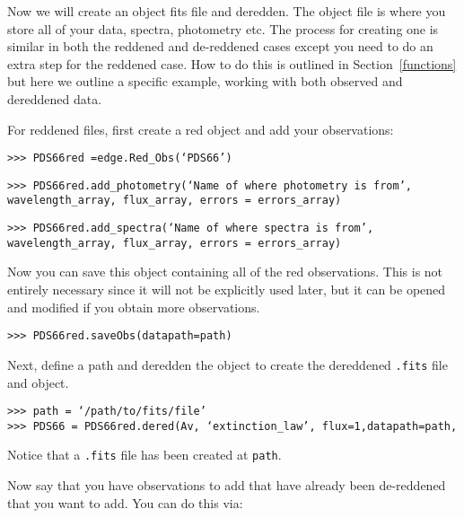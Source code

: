 \documentclass{article}
\begin{document}
\noindent Now we will create an object fits file and deredden. The object file is where you store all of your data, spectra, photometry etc.  The process for creating one is similar in both the reddened and de-reddened cases except you need to do an extra step for the reddened case.  How to do this is outlined in Section~\ref{functions} but here we outline a specific example, working with both observed and dereddened data.

\noindent For reddened files, first create a red object and add your observations:

\vspace{2mm}
\texttt{>>> PDS66red =edge.Red\_Obs(`PDS66')}
\vspace{2mm}

\vspace{2mm}
\texttt{>>> PDS66red.add\_photometry(`Name of where photometry is from',}\\
\texttt{wavelength\_array, flux\_array, errors = errors\_array)}	
\vspace{2mm}

\vspace{2mm}
\texttt{>>> PDS66red.add\_spectra(`Name of where spectra is from',}\\
\texttt{wavelength\_array, flux\_array, errors = errors\_array)}	
\vspace{2mm}

\noindent Now you can save this object containing all of the red observations. This is not entirely necessary since it will not be explicitly used later, but it can be opened and modified if you obtain more observations. 

\vspace{2mm}
\texttt{>>> PDS66red.saveObs(datapath=path)}
\vspace{2mm}

\noindent Next, define a path and deredden the object to create the dereddened \texttt{.fits} file and object.

\vspace{2mm}
\texttt{>>> path = `/path/to/fits/file'}\\
\texttt{>>> PDS66 = PDS66red.dered(Av, `extinction\_law', flux=1,datapath=path, }\\
\vspace{2mm}

\noindent Notice that a \texttt{.fits} file has been created at \texttt{path}.

\noindent Now say that you have observations to add that have already been de-reddened that you want to add. You can do this  via:
\end{document}
